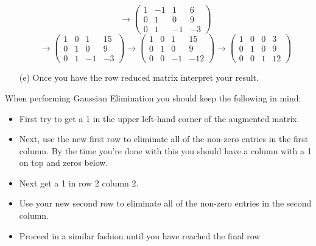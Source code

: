 \begin{problem}
\begin{enumerate}
{\[                    \to \left( \begin{array}{ccc|c} 1 & -1 & 1 & 6 \\ 0 & 1 & 0 & 9 \\ 0 &
                        1 & -1 & -3 \end{array} \right)
                        \]
                \[ 
                    \to \left( \begin{array}{ccc|c} 1 & 0 & 1 & 15 \\ 0 & 1 & 0 & 9 \\ 0 &
                        1 & -1 & -3 \end{array} \right)
                    \to \left( \begin{array}{ccc|c} 1 & 0 & 1 & 15 \\ 0 & 1 & 0 & 9 \\ 0 &
                        0 & -1 & -12 \end{array} \right)
                    \to \left( \begin{array}{ccc|c} 1 & 0 & 0 & 3 \\ 0 & 1 & 0 & 9 \\ 0 &
                        0 & 1 & 12 \end{array} \right)
                        \]
            }
        \item[(e)] Once you have the row reduced matrix interpret your result.
    \end{enumerate}
\end{problem}

\begin{technique}
    When performing Gaussian Elimination you should keep the following in mind:
    \begin{itemize}
        \item First try to get a 1 in the upper left-hand corner of the augmented matrix.
        \item Next, use the new first row to eliminate all of the non-zero entries in the first
            column. By the
            time you're done with this you should have a column with a 1 on top and zeros below.
        \item Next get a 1 in row 2 column 2.
        \item Use your new second row to eliminate all of the non-zero entries in the second
            column.
        \item Proceed in a similar fashion until you have reached the final row
    \end{itemize}
\end{technique}

